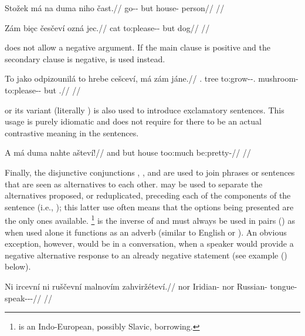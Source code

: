 \pex
\begingl
\gla Stožek má na duma niho čast.//
\glb go-\Av{}-\Pf{} but \Loc{} house-\Acc{}  person//
\glft {}//
\endgl
\xe


\pex[tag=ozna]
\begingl
\gla Zám bięc česčeví ozná jec.//
\glb \Neg{} cat to:please-\Av{}-\Cont{} but dog//
\glft {}//
\endgl
\xe

 does not allow a negative argument. If the main
clause is positive and the secondary clause is negative,  is used
instead.

\pex
\begingl
\gla To jako odpizounilá to hrebe cešceví, má zám jáne.//
\glb \Dem{}.\Prox{} tree to:grow-\Loc{}-\Subj{}.\Ipf{} \Rz{} mushroom-\Acc{} to:please-\Av{}-\Cont{} but \Neg{} \Dem{}.\Med{}//
\glft {}//
\endgl
\xe

 or its variant  (literally ) is also used to
introduce exclamatory sentences. This usage is purely idiomatic and does not
require for there to be an actual contrastive meaning in the sentences.

\pex
\begingl
\gla A má duma nahte ašteví!// \glb and but house too:much be:pretty-\Cont{}//
\glft {}//
\endgl
\xe

Finally, the disjunctive conjunctions ,
, and  are used to join phrases or sentences that are seen as
alternatives to each other.  may be used to separate the
alternatives proposed, or reduplicated, preceding each of the components of the
sentence (i.e., ); this latter use often means
that the options being presented are the only ones available.
\footnote{ is an Indo-European, possibly Slavic,
borrowing.} is the inverse of  and must
always be used in pairs () as when used alone
it functions as an adverb (similar to English  or ).
An obvious exception, however, would be in a conversation, when a speaker would
provide a negative alternative response to an already negative statement (see
example () below).

\pex
\begingl
\gla Ni ircevní ni ruščevní malnovím zahviržéteví.//
\glb nor Iridian-\Att{} nor Russian-\Att{} tongue-\Ins{} speak-\Av{}-\Pot{}-\Cont{}//
\glft {}//
\endgl
\xe

